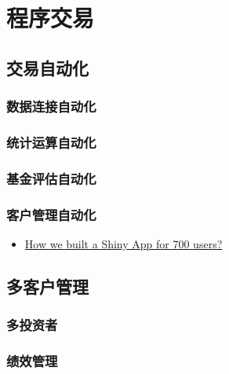 \documentclass[]{book}
\providecommand{\tightlist}{%
  \setlength{\itemsep}{0pt}\setlength{\parskip}{0pt}}
\begin{document}
\chapter{程序交易}\label{algorithm}

\section{交易自动化}

\subsection{数据连接自动化}

\subsection{统计运算自动化}

\subsection{基金评估自动化}

\subsection{客户管理自动化}

\begin{itemize}
\tightlist
\item
  \href{https://appsilon.com/how-we-built-a-shiny-app-for-700-users/}{How
  we built a Shiny App for 700 users?}
\end{itemize}

\section{多客户管理}

\subsection{多投资者}

\subsection{绩效管理}

\section{}\label{section-4}
\end{document}
